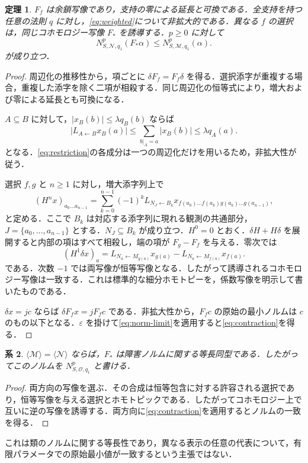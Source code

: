 \documentclass[11pt,a4paper]{article}
\numberwithin{equation}{section}
\theoremstyle{japanese}
\newtheorem{theorem}{定理}[section]
\newtheorem{corollary}[theorem]{系}
\theoremstyle{remark}
\newcommand{\M}{\mathcal M}
\newcommand{\OO}{\mathcal O}
\begin{document}
\begin{theorem}\label{thm:restriction}
$F_f$ は余鎖写像であり，支持の零による延長と可換である．全支持を持つ任意の法則 $q$ に対し，\eqref{eq:weighted}について非拡大的である．異なる $f$ の選択は，同じコホモロジー写像 $F_*$ を誘導する．$p\ge0$ に対して
\begin{equation}\label{eq:contraction}
 N^p_{S,\mathcal N,q_1}(F_*\alpha)\le N^p_{S,\M,q_1}(\alpha).
\end{equation}
が成り立つ．
\end{theorem}
\begin{proof}
周辺化の推移性から，項ごとに $\delta F_f=F_f\delta$ を得る．選択添字が重複する場合，重複した添字を除く二項が相殺する．同じ周辺化の恒等式により，増大および零による延長とも可換になる．

$A\subseteq B$ に対して，$|x_B(b)|\le\lambda q_B(b)$ ならば
\begin{equation}\label{eq:box-contraction}
 |L_{A\leftarrow B}x_B(a)|\le\sum_{b|_A=a}|x_B(b)|\le\lambda q_A(a).
\end{equation}
となる．\eqref{eq:restriction}の各成分は一つの周辺化だけを用いるため，非拡大性が従う．

選択 $f,g$ と $n\ge1$ に対し，増大添字列上で
\begin{equation}\label{eq:homotopy}
 (H^nx)_{a_0\ldots a_{n-1}}=
 \sum_{k=0}^{n-1}(-1)^k L_{N_J\leftarrow B_k}
 x_{f(a_0)\ldots f(a_k)g(a_k)\ldots g(a_{n-1})},
\end{equation}
と定める．ここで $B_k$ は対応する添字列に現れる観測の共通部分，$J=\{a_0,\ldots,a_{n-1}\}$ とする．$N_J\subseteq B_k$ が成り立つ．$H^0=0$ とおく．$\delta H+H\delta$ を展開すると内部の項はすべて相殺し，端の項が $F_g-F_f$ を与える．零次では
\[
 (H^1\delta x)_a=L_{N_a\leftarrow M_{g(a)}}x_{g(a)}
 -L_{N_a\leftarrow M_{f(a)}}x_{f(a)}.
\]
である．次数 $-1$ では両写像が恒等写像となる．したがって誘導されるコホモロジー写像は一致する．これは標準的な細分ホモトピー\cite[Proposition~6.10 and Theorem~6.30]{BPSV}を，係数写像を明示して書いたものである．

$\delta x=jc$ ならば $\delta F_fx=jF_fc$ である．非拡大性から，$F_fc$ の原始の最小ノルムは $c$ のもの以下となる．$\varepsilon$ を掛けて\eqref{eq:norm-limit}を適用すると\eqref{eq:contraction}を得る．
\end{proof}

\begin{corollary}\label{cor:list}
$\langle\M\rangle=\langle\mathcal N\rangle$ ならば，$F_*$ は障害ノルムに関する等長同型である．したがってこのノルムを $N^p_{S,\OO,q_1}$ と書ける．
\end{corollary}
\begin{proof}
両方向の写像を選ぶ．その合成は恒等包含に対する許容される選択であり，恒等写像を与える選択とホモトピックである．したがってコホモロジー上で互いに逆の写像を誘導する．両方向に\eqref{eq:contraction}を適用するとノルムの一致を得る．
\end{proof}
これは類のノルムに関する等長性であり，異なる表示の任意の代表について，有限パラメータでの原始最小値が一致するという主張ではない．
\end{document}
